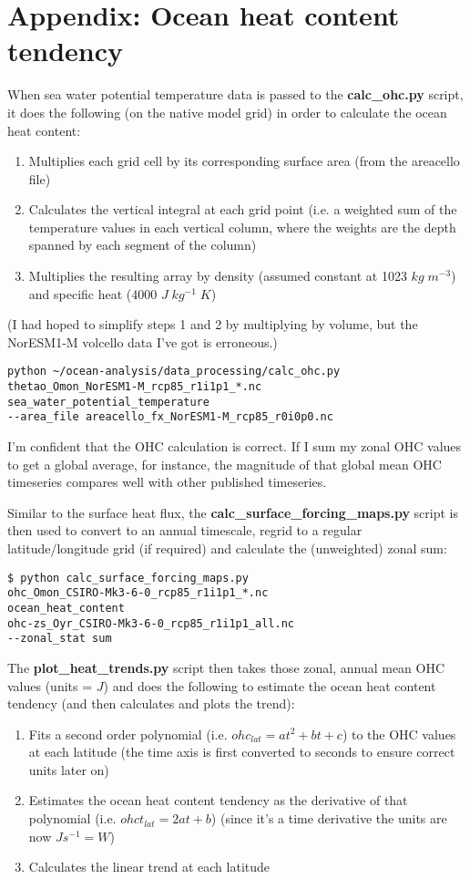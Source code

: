 \section{Appendix: Ocean heat content tendency}

When sea water potential temperature data is passed to the \textbf{calc_ohc.py} script, it does the following (on the native model grid) in order to calculate the ocean heat content:
\begin{enumerate}
\item Multiplies each grid cell by its corresponding surface area (from the areacello file)
\item Calculates the vertical integral at each grid point (i.e. a weighted sum of the temperature values in each vertical column, where the weights are the depth spanned by each segment of the column)
\item Multiplies the resulting array by density (assumed constant at 1023 $kg\; m^{-3}$) and specific heat (4000 $J\; kg^{-1}\; K$)
\end{enumerate}

(I had hoped to simplify steps 1 and 2 by multiplying by volume, but the NorESM1-M volcello data I've got is erroneous.) 

\begin{verbatim}
python ~/ocean-analysis/data_processing/calc_ohc.py 
thetao_Omon_NorESM1-M_rcp85_r1i1p1_*.nc 
sea_water_potential_temperature
--area_file areacello_fx_NorESM1-M_rcp85_r0i0p0.nc
\end{verbatim}

I'm confident that the OHC calculation is correct. If I sum my zonal OHC values to get a global average, for instance, the magnitude of that global mean OHC timeseries compares well with other published timeseries.

Similar to the surface heat flux, the \textbf{calc_surface_forcing_maps.py} script is then used to convert to an annual timescale, regrid to a regular latitude/longitude grid (if required) and calculate the (unweighted) zonal sum:

\begin{verbatim}
$ python calc_surface_forcing_maps.py 
ohc_Omon_CSIRO-Mk3-6-0_rcp85_r1i1p1_*.nc
ocean_heat_content
ohc-zs_Oyr_CSIRO-Mk3-6-0_rcp85_r1i1p1_all.nc
--zonal_stat sum
\end{verbatim}

The \textbf{plot_heat_trends.py} script then takes those zonal, annual mean OHC values (units = $J$) and does the following to estimate the ocean heat content tendency (and then calculates and plots the trend):
\begin{enumerate}
\item Fits a second order polynomial (i.e. $ohc_{lat} = at^2 + bt + c$) to the OHC values at each latitude (the time axis is first converted to seconds to ensure correct units later on)
\item Estimates the ocean heat content tendency as the derivative of that polynomial (i.e. $ohct_{lat} = 2at + b$) (since it's a time derivative the units are now $Js^{-1} = W$)
\item Calculates the linear trend at each latitude
\end{enumerate}

